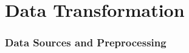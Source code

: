 \part{Data Transformation}
\label{data_transformation}
\section{Data Sources and Preprocessing} \label{sec:data-sources-and-preprocessing}






